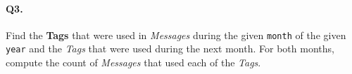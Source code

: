 \paragraph{Q3.}
Find the \textbf{Tags} that were used in \emph{Messages} during the
given \texttt{month} of the given \texttt{year} and the \emph{Tags} that
were used during the next month.
For both months, compute the count of \emph{Messages} that used each of
the \emph{Tags}.

